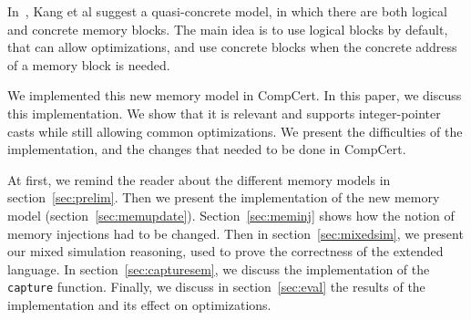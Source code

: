 In~\cite{DBLP:conf/pldi/KangHMGZV15}, Kang et al suggest a quasi-concrete model, in which there are both logical and concrete memory blocks. The main idea is to use logical blocks by default, that can allow optimizations, and use concrete blocks when the concrete address of a memory block is needed.

We implemented this new memory model in CompCert.
In this paper, we discuss this implementation.
We show that it is relevant and supports integer-pointer casts while still allowing common optimizations.
We present the difficulties of the implementation, and the changes that needed to be done in CompCert.

At first, we remind the reader about the different memory models in section~\ref{sec:prelim}.
Then we present the implementation of the new memory model (section~\ref{sec:memupdate}). Section~\ref{sec:meminj} shows how the notion of memory injections had to be changed. Then in section~\ref{sec:mixedsim}, we present our mixed simulation reasoning, used to prove the correctness of the extended language. In section~\ref{sec:capturesem}, we discuss the implementation of the \texttt{capture} function.
Finally, we discuss in section~\ref{sec:eval} the results of the implementation and its effect on optimizations. 

